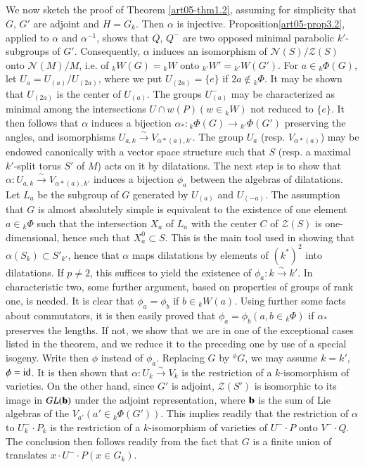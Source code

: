 \subsection{}\label{art05-sec3.3}
We now sketch the proof of Theorem \ref{art05-thm1.2}, assuming for simplicity that $G$, $G'$ are adjoint and $H=G_{k}$. Then $\alpha$ is injective. Proposition\pageoriginale \ref{art05-prop3.2}, applied to $\alpha$ and $\alpha^{-1}$, shows that $Q$, $Q^{-}$ are two opposed minimal parabolic $k'$-subgroups of $G'$. Consequently, $\alpha$ induces an isomorphism of $\mathscr{N}(S)/\mathscr{Z}(S)$ onto $\mathscr{N}(M)/M$, i.e. of ${}_{k}W(G)={}_{k}W$ onto ${}_{k'}W'={}_{k'}W(G')$. For $a\in {}_{k}\Phi(G)$, let $U_{a}=U_{(a)}/U_{(2a)}$, where we put $U_{(2a)}=\{e\}$ if $2a\not\in {}_{k}\Phi$. It may be shown that $U_{(2a)}$ is the center of $U_{(a)}$. The groups $U^{-}_{(a)}$ may be characterized as minimal among the intersections $U\cap w(P)(w\in {}_{k}W)$ not reduced to $\{e\}$. It then follows that $\alpha$ induces a bijection $\alpha_{*}:{}_{k}\Phi(G)\to {}_{k'}\Phi(G')$ preserving the angles, and isomorphisms $U_{a,k}\xrightarrow{\sim}V_{\alpha *(a),k'}$. The group $U_{a}$ (resp. $V_{\alpha * (a)}$) may be endowed canonically with a vector space structure such that $S$ (resp. a maximal $k'$-split torus $S'$ of $M$) acts on it by dilatations. The next step is to show that $\alpha:U_{a,k}\xrightarrow{\sim}V_{\alpha *(a),k'}$ induces a bijection $\phi_{a}$ between the algebras of dilatations. Let $L_{a}$ be the subgroup of $G$ generated by $U_{(a)}$ and $U_{(-a)}$. The assumption that $G$ is almost absolutely simple is equivalent to the existence of one element $a\in {}_{k}\Phi$ such that the intersection $X_{a}$ of $L_{a}$ with the center $C$ of $\mathscr{Z}(S)$ is one-dimensional, hence such that $X^{0}_{a}\subset S$. This is the main tool used in showing that $\alpha(S_{k})\subset S'_{k'}$, hence that $\alpha$ maps dilatations by elements of $(k^{*})^{2}$ into dilatations. If $p\neq 2$, this suffices to yield the existence of $\phi_{a}:k\xrightarrow{\sim}k'$. In characteristic two, some further argument, based on properties of groups of rank one, is needed. It is clear that $\phi_{a}=\phi_{b}$ if $b\in {}_{k}W(a)$. Using further some facts about commutators, it is then easily proved that $\phi_{a}=\phi_{b}(a,b\in{}_{k}\Phi)$ if $\alpha_{*}$ preserves the lengths. If not, we show that we are in one of the exceptional cases listed in the theorem, and we reduce it to the preceding one by use of a special isogeny. Write then $\phi$ instead of $\phi_{a}$. Replacing $G$ by ${}^{\phi}G$, we may assume $k=k'$, $\phi=\operatorname{\mathrm{id}}$. It is then shown that $\alpha:U_{k}\xrightarrow{\sim}V_{k}$ is the restriction of a $k$-isomorphism of varieties. On the other hand, since $G'$ is adjoint, $\mathscr{Z}(S')$ is isomorphic to its image in $GL(\mathbf{b})$ under the adjoint representation, where $\mathbf{b}$ is the sum of Lie algebras of the $V_{a'}(a'\in{}_{k}\Phi(G'))$. This implies readily that the restriction of $\alpha$ to $U^{-}_{k}\cdot P_{k}$ is the restriction of a $k$-isomorphism of varieties of $U^{-}\cdot P$ onto $V^{-}\cdot Q$. The conclusion then follows readily from the fact that $G$ is a finite union of translates $x\cdot U^{-}\cdot P(x\in G_{k})$.

